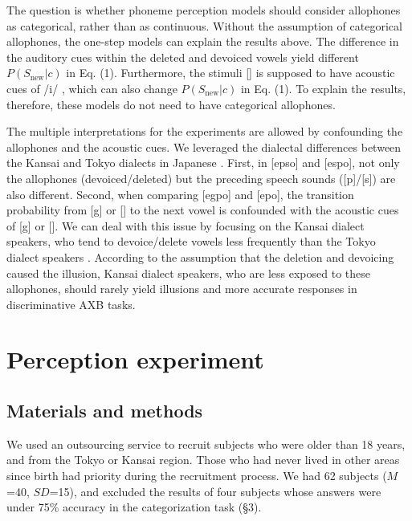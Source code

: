 \documentclass[a4paper,11pt,twocolumn]{article}
\begin{document}
The question is whether phoneme perception models should consider allophones as categorical, rather than as continuous. Without the assumption of categorical allophones, the one-step models can explain the results above. The difference in the auditory cues within the deleted and devoiced vowels yield different $P(S_{\text{new}}|c)$ in Eq. (1). Furthermore, the stimuli [\textctc] is supposed to have acoustic cues of /i/ \cite{kubozono1999japanese_eng}, which can also change $P(S_{\text{new}}|c)$ in Eq. (1). To explain the results, therefore, these models do not need to have categorical allophones.

The multiple interpretations for the experiments are allowed by confounding the allophones and the acoustic cues. We leveraged the dialectal differences between the Kansai and Tokyo dialects in Japanese \cite{kishiyama2022onestep}. First, in [ep\textsubring{\textturnm}so] and [espo], not only the allophones (devoiced/deleted) but the preceding speech sounds ([p]/[s]) are also different. Second, when comparing [egpo] and [e\textctc{}po], the transition probability from [g] or [\textctc] to the next vowel is confounded with the acoustic cues of [g] or [\textctc]. We can deal with this issue by focusing on the Kansai dialect speakers, who tend to devoice/delete vowels less frequently than the Tokyo dialect speakers \cite{byun2011_eng, byun2012_eng}. According to the assumption that the deletion and devoicing caused the illusion, Kansai dialect speakers, who are less exposed to these allophones, should rarely yield illusions and more accurate responses in discriminative AXB tasks.

\section{Perception experiment}

\subsection{Materials and methods}

We used an outsourcing service to recruit subjects who were older than 18 years, and from the Tokyo or Kansai region. Those who had never lived in other areas since birth had priority during the recruitment process. We had 62 subjects ($M$=40, $SD$=15), and excluded the results of four subjects whose answers were under 75\% accuracy in the categorization task (\S3).
\end{document}
